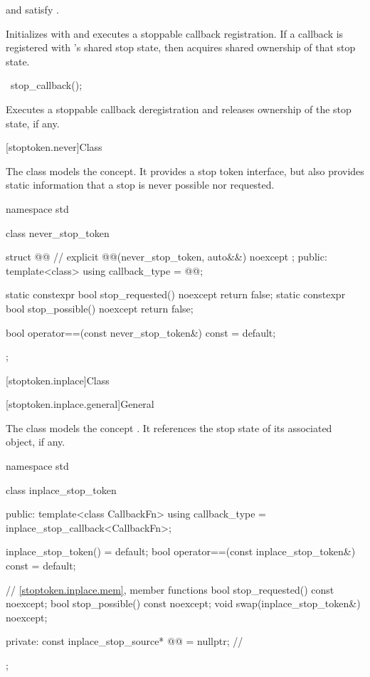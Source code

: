 \begin{itemdescr}
\pnum
\constraints
{} and  satisfy
.

\pnum
\effects
Initializes  with 
and executes a stoppable callback registration.
If a callback is registered with 's shared stop state,
then  acquires shared ownership of that stop state.
\end{itemdescr}

%
\begin{itemdecl}
~stop_callback();
\end{itemdecl}

\begin{itemdescr}
\pnum
\effects
Executes a stoppable callback deregistration and
releases ownership of the stop state, if any.
\end{itemdescr}

[stoptoken.never]{Class }

\pnum
The class  models
the  concept.
It provides a stop token interface,
but also provides static information
that a stop is never possible nor requested.
\begin{codeblock}
namespace std {
  class never_stop_token {
    struct @@ {                                      // \expos
      explicit @@(never_stop_token, auto&&) noexcept {}
    };
  public:
    template<class>
      using callback_type = @@;

    static constexpr bool stop_requested() noexcept { return false; }
    static constexpr bool stop_possible() noexcept { return false; }

    bool operator==(const never_stop_token&) const = default;
  };
}
\end{codeblock}

[stoptoken.inplace]{Class }

[stoptoken.inplace.general]{General}

\pnum
The class  models
the concept .
It references the stop state of
its associated  object,
if any.
\begin{codeblock}
namespace std {
  class inplace_stop_token {
  public:
    template<class CallbackFn>
      using callback_type = inplace_stop_callback<CallbackFn>;

    inplace_stop_token() = default;
    bool operator==(const inplace_stop_token&) const = default;

    // \ref{stoptoken.inplace.mem}, member functions
    bool stop_requested() const noexcept;
    bool stop_possible() const noexcept;
    void swap(inplace_stop_token&) noexcept;

  private:
    const inplace_stop_source* @@ = nullptr;           // \expos
  };
}
\end{codeblock}

